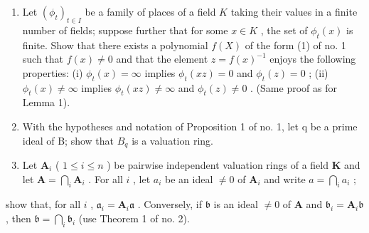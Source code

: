 
\begin{enumerate}
\def\labelenumi{\arabic{enumi}.}
\item
  Let \((\phi_{t})_{t\in I}\) be a family of places of a field \(K\) taking their values in a finite number of fields; suppose further that for some \(x\in K\) , the set of \(\phi_t(x)\) is finite. Show that there exists a polynomial \(f(X)\) of the form (1) of no. 1 such that \(f(x)\neq 0\) and that the element \(z = f(x)^{-1}\) enjoys the following properties: (i) \(\phi_t(x) = \infty\) implies \(\phi_t(xz) = 0\) and \(\phi_t(z) = 0\) ; (ii) \(\phi_t(x)\neq \infty\) implies \(\phi_t(xz)\neq \infty\) and \(\phi_t(z)\neq 0\) . (Same proof as for Lemma 1).
\item
  With the hypotheses and notation of Proposition 1 of no. 1, let q be a prime ideal of B; show that \(B_{q}\) is a valuation ring.
\item
  Let \(\mathbf{A}_i\) ( \(1 \leqslant i \leqslant n\) ) be pairwise independent valuation rings of a field \(\mathbf{K}\) and let \(\mathbf{A} = \bigcap_{i} \mathbf{A}_i\) . For all \(i\) , let \(a_i\) be an ideal \(\neq 0\) of \(\mathbf{A}_i\) and write \(a = \bigcap_{i} a_i\) ;
\end{enumerate}

show that, for all \(i\) , \(\mathfrak{a}_i = \mathbf{A}_i\mathfrak{a}\) . Conversely, if \(\mathfrak{b}\) is an ideal \(\neq 0\) of \(\mathbf{A}\) and \(\mathfrak{b}_i = \mathbf{A}_i\mathfrak{b}\) , then \(\mathfrak{b} = \bigcap_i \mathfrak{b}_i\) (use Theorem 1 of no. 2).

